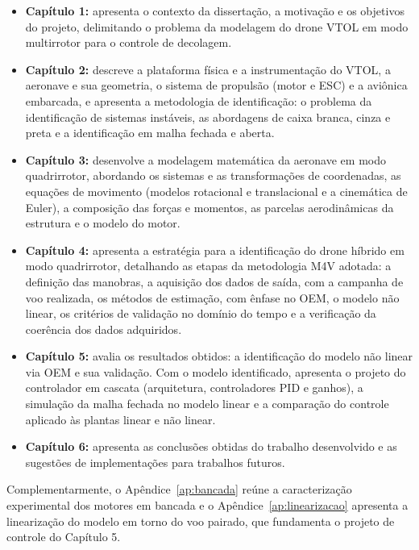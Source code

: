 \begin{itemize}
    \item \textbf{Capítulo 1:} apresenta o contexto da dissertação, a motivação e os objetivos do projeto, delimitando o problema da modelagem do drone VTOL em modo multirrotor para o controle de decolagem.

    \item {\color{blue}\textbf{Capítulo 2:} descreve a plataforma física e a instrumentação do VTOL, a aeronave e sua geometria, o sistema de propulsão (motor e ESC) e a aviônica embarcada, e apresenta a metodologia de identificação: o problema da identificação de sistemas instáveis, as abordagens de caixa branca, cinza e preta e a identificação em malha fechada e aberta.}

    \item {\color{blue}\textbf{Capítulo 3:}} desenvolve a modelagem matemática da aeronave em modo quadrirrotor, abordando os sistemas e as transformações de coordenadas, as equações de movimento (modelos rotacional e translacional e a cinemática de Euler){\color{blue}, a composição das forças e momentos, as parcelas aerodinâmicas da estrutura} e o modelo do motor.

    \item \textbf{Capítulo 4:} apresenta a estratégia para a identificação do drone híbrido em modo quadrirrotor{\color{blue}, detalhando} as etapas da metodologia M4V adotada: a definição das manobras, a aquisição dos dados de saída{\color{blue}, com a campanha de voo realizada}, os métodos de estimação, com ênfase no OEM, o modelo não linear, os critérios de validação no domínio do tempo {\color{blue}e a verificação da coerência dos dados adquiridos}.

    \item \textbf{Capítulo 5:} avalia os resultados obtidos{\color{blue}: a} identificação do modelo não linear via OEM e {\color{blue}sua} validação. Com o modelo identificado, apresenta o projeto do controlador em cascata (arquitetura, controladores PID e ganhos), a simulação da malha fechada no modelo linear e a comparação do controle aplicado às plantas linear e não linear.

    \item \textbf{Capítulo 6:} apresenta as conclusões obtidas do trabalho desenvolvido e as sugestões de implementações para trabalhos futuros.
\end{itemize}

Complementarmente, o Apêndice~\ref{ap:bancada} reúne a caracterização experimental dos motores em bancada e o Apêndice~\ref{ap:linearizacao} apresenta a linearização do modelo em torno do voo pairado, que fundamenta o projeto de controle do Capítulo 5.
